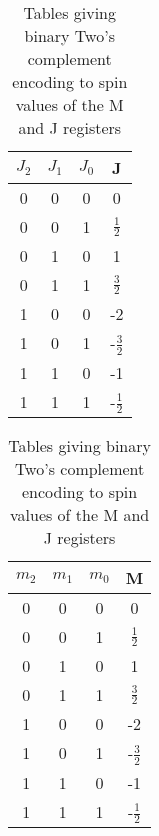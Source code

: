 \begin{table}[h]
\begin{tabular}{ |c c c|c| } 
\hline
 $J_2$ &$J_1$ &$J_0$ &J \\
 \hline
 0 &0 &0 &0 \\ 
 0 &0 &1 &$\frac{1}{2}$ \\ 
 0 &1 &0 &1 \\ 
 0 &1 &1 &$\frac{3}{2}$ \\ 
 \hline 
 1 &0 &0 &-2 \\ 
 1 &0 &1 &-$\frac{3}{2}$ \\ 
 1 &1 &0 &-1 \\ 
 1 &1 &1 &-$\frac{1}{2}$ \\  
 \hline 
\end{tabular}
\quad
\begin{tabular}{ |c c c|c| } 
\hline
 $m_2$ &$m_1$ &$m_0$ &M \\
 \hline
 0 &0 &0 &0 \\ 
 0 &0 &1 &$\frac{1}{2}$ \\ 
 0 &1 &0 &1 \\ 
 0 &1 &1 &$\frac{3}{2}$ \\ 
 \hline 
 1 &0 &0 &-2 \\ 
 1 &0 &1 &-$\frac{3}{2}$ \\ 
 1 &1 &0 &-1 \\ 
 1 &1 &1 &-$\frac{1}{2}$ \\  
 \hline
\end{tabular}
\caption{Tables giving binary Two's complement encoding to spin values of the M and J registers}
\label{fig:encoding}
\end{table}
